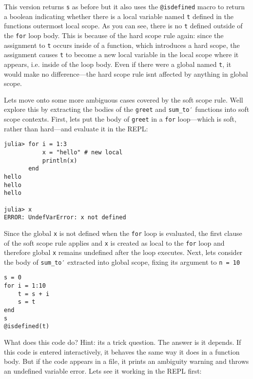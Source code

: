 This version returns \texttt{s} as before but it also uses the \texttt{@isdefined} macro to return a boolean indicating whether there is a local variable named \texttt{t} defined in the function{\textquotesingle}s outermost local scope. As you can see, there is no \texttt{t} defined outside of the \texttt{for} loop body. This is because of the hard scope rule again: since the assignment to \texttt{t} occurs inside of a function, which introduces a hard scope, the assignment causes \texttt{t} to become a new local variable in the local scope where it appears, i.e. inside of the loop body. Even if there were a global named \texttt{t}, it would make no difference—the hard scope rule isn{\textquotesingle}t affected by anything in global scope.



Let{\textquotesingle}s move onto some more ambiguous cases covered by the soft scope rule. We{\textquotesingle}ll explore this by extracting the bodies of the \texttt{greet} and \texttt{sum\_to′} functions into soft scope contexts. First, let{\textquotesingle}s put the body of \texttt{greet} in a \texttt{for} loop—which is soft, rather than hard—and evaluate it in the REPL:




\begin{verbatim}
julia> for i = 1:3
           x = "hello" # new local
           println(x)
       end
hello
hello
hello

julia> x
ERROR: UndefVarError: x not defined
\end{verbatim}



Since the global \texttt{x} is not defined when the \texttt{for} loop is evaluated, the first clause of the soft scope rule applies and \texttt{x} is created as local to the \texttt{for} loop and therefore global \texttt{x} remains undefined after the loop executes. Next, let{\textquotesingle}s consider the body of \texttt{sum\_to′} extracted into global scope, fixing its argument to \texttt{n = 10}




\begin{verbatim}
s = 0
for i = 1:10
    t = s + i
    s = t
end
s
@isdefined(t)
\end{verbatim}



What does this code do? Hint: it{\textquotesingle}s a trick question. The answer is {\textquotedbl}it depends.{\textquotedbl} If this code is entered interactively, it behaves the same way it does in a function body. But if the code appears in a file, it  prints an ambiguity warning and throws an undefined variable error. Let{\textquotesingle}s see it working in the REPL first:




